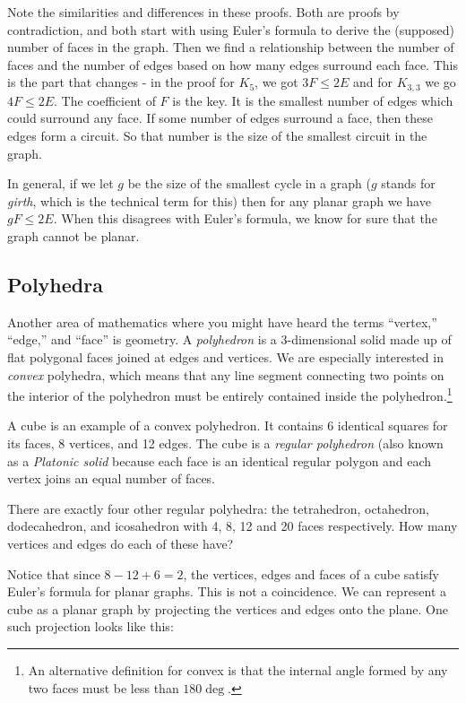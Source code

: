 \documentclass[12pt]{article}
\begin{document}
Note the similarities and differences in these proofs.  Both are proofs by contradiction, and both start with using Euler's formula to derive the (supposed) number of faces in the graph.  Then we find a relationship between the number of faces and the number of edges based on how many edges surround each face.  This is the part that changes - in the proof for $K_5$, we got $3F \le 2E$ and for $K_{3,3}$ we go $4F \le 2E$.  The coefficient of $F$ is the key.  It is the smallest number of edges which could surround any face.  If some number of edges surround a face, then these edges form a circuit.  So that number is the size of the smallest circuit in the graph.

In general, if we let $g$ be the size of the smallest cycle in a graph ($g$ stands for {\em girth}, which is the technical term for this) then for any planar graph we have $gF \le 2E$.  When this disagrees with Euler's formula, we know for sure that the graph cannot be planar.

\subsection{Polyhedra}

Another area of mathematics where you might have heard the terms ``vertex,'' ``edge,'' and ``face'' is geometry.  A \emph{polyhedron} is a 3-dimensional solid made up of flat polygonal faces joined at edges and vertices.  We are especially interested in \emph{convex} polyhedra, which means that any line segment connecting two points on the interior of the polyhedron must be entirely contained inside the polyhedron.\footnote{An alternative definition for convex is that the internal angle formed by any two faces must be less than $180\deg$.}

\begin{activity}
A cube is an example of a convex polyhedron.  It contains 6 identical squares for its faces, 8 vertices, and 12 edges.  The cube is a \emph{regular polyhedron} (also known as a \emph{Platonic solid} because each face is an identical regular polygon and each vertex joins an equal number of faces.

There are exactly four other regular polyhedra: the tetrahedron, octahedron, dodecahedron, and icosahedron with 4, 8, 12 and 20 faces respectively.  How many vertices and edges do each of these have?
\end{activity}

Notice that since $8 - 12 + 6 = 2$, the vertices, edges and faces of a cube satisfy Euler's formula for planar graphs.  This is not a coincidence.  We can represent a cube as a planar graph by projecting the vertices and edges onto the plane.  One such projection looks like this:
\end{document}
